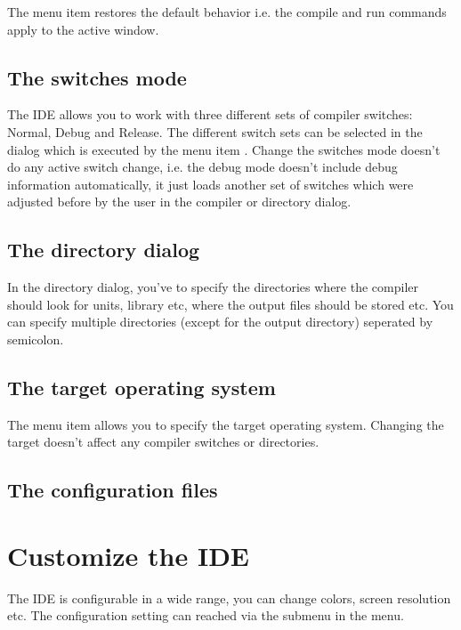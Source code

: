 The menu item  restores the default behavior
i.e. the compile and run commands apply to the active window.

\subsection{The switches mode}
The IDE allows you to work with three different sets of compiler
switches: Normal, Debug and Release. The different switch
sets can be selected in the  dialog which
is executed by the menu item .
Change the switches mode doesn't do any active switch change, i.e.
the debug mode doesn't include debug information automatically,
it just loads another set of switches which were adjusted before
by the user in the compiler or directory dialog.

\subsection{The directory dialog}
In the directory dialog, you've to specify the directories where
the compiler should look for units, library etc, where the
output files should be stored etc. You can specify multiple
directories (except for the output directory) seperated by
semicolon.

\begin{description}
\end{description}

\subsection{The target operating system}
The menu item  allows you to specify the target
operating system. Changing the target doesn't affect any compiler
switches or directories.

\subsection{The configuration files}

\section{Customize the IDE}
The IDE is configurable in a wide range, you can change colors, screen
resolution etc. The configuration setting can reached via the
submenu  in the  menu.

